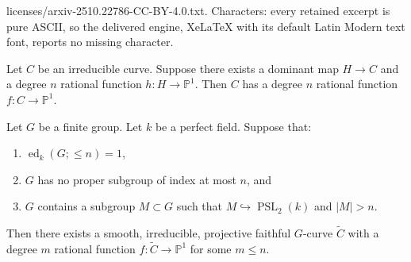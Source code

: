 \documentclass[10pt,a4paper]{amsart}
\DeclareMathOperator{\PSL}{PSL}
\DeclareMathOperator{\ed}{ed}
\newcommand{\Pb}{\mathbb{P}}
\newcommand{\into}{\hookrightarrow}
\newcommand{\tC}{\widetilde{C}}
\begin{document}
licenses/arxiv-2510.22786-CC-BY-4.0.txt. Characters: every retained excerpt is pure ASCII, so the delivered engine, XeLaTeX with its default Latin Modern text font, reports no missing character.
\begin{lemma}\label{l:lur}
	Let $C$ be an irreducible curve. Suppose there exists a dominant map $H\to C$ and a degree $n$ rational function $h\colon H\to \Pb^1$. Then $C$ has a degree $n$ rational function $f\colon C\to \Pb^1$.
\end{lemma}

\begin{lemma}\label{l:irred}
	Let $G$ be a finite group. Let $k$ be a perfect field. Suppose that:
    \begin{enumerate}
        \item $\ed_k(G;\le n)=1$,
        \item $G$ has no proper subgroup of index at most $n$, and
        \item $G$ contains a subgroup $M\subset G$ such that $M\into \PSL_2(k)$ and $|M|>n$.
    \end{enumerate}
    Then there exists a smooth, irreducible, projective faithful $G$-curve $\tilde{C}$ with a degree $m$ rational function $f\colon\tC\to\Pb^1$ for some $m\le n$.  
\end{lemma}
\end{document}
